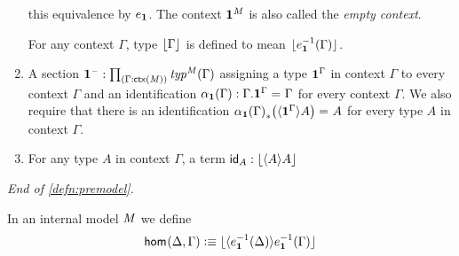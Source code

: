 \begin{defn}
\begin{enumerate}
this equivalence by $e_\mathbf{1}$. The context $\mathbf{1}^\mathit{M}$ is also
called the \emph{empty context}.
\begin{defn}
For any context $\Gamma$, type $\lfloor \Gamma \rfloor^{}$ is defined to mean
$\lfloor e_\mathbf{1}^{-1}(\Gamma) \rfloor^{}$. 
\end{defn}
\item A section $\unit^{\blank}:\prd{\Gamma:\ctx(\mfM)}\mftyp{\mfM}{\Gamma}$ assigning
a type $\mathbf{1}^\Gamma$ in context $\Gamma$ to every context $\Gamma$ and
an identification $\alpha_\unit(\Gamma):\id{\ctxext{\Gamma}{\unit^\Gamma}}{\Gamma}$
for every context $\Gamma$. We also require that there is an identification
$\id{\trans{\alpha_\unit(\Gamma)}{\ctxwk{\unit^\Gamma}{A}}}{A}$ for every
type $A$ in context $\Gamma$.
\item For any type $A$ in context $\Gamma$, a term $\idfunc[A]:\terms{\ctxwk{A}{A}}$
\end{enumerate}
\begin{flushright}
\textsl{End of \autoref{defn:premodel}.}
\end{flushright}
\end{defn}

\begin{defn}
In an internal model $\mathit{M}$ we define
\begin{equation*}
\ctxhom{\Delta}{\Gamma}\defeq \terms{\ctxwk{e_\unit^{-1}(\Delta)}{e_\unit^{-1}(\Gamma)}}
\end{equation*}
\end{defn}

